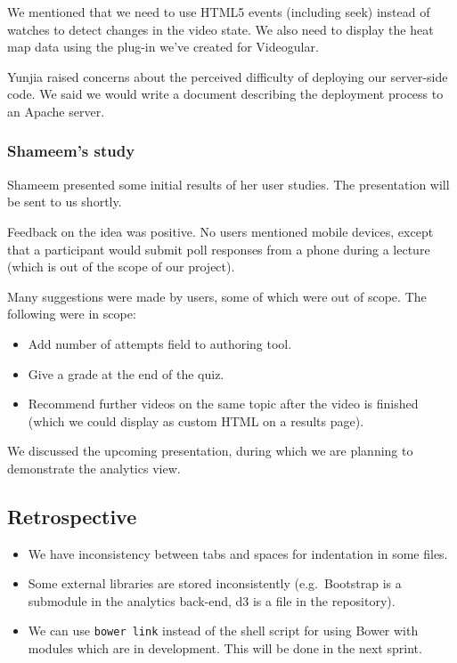 We mentioned that we need to use HTML5 events (including seek) instead
of watches to detect changes in the video state. We also need to display
the heat map data using the plug-in we've created for Videogular.

Yunjia raised concerns about the perceived difficulty of deploying our
server-side code. We said we would write a document describing the
deployment process to an Apache server.

\subsubsection{Shameem's study}

Shameem presented some initial results of her user studies. The
presentation will be sent to us shortly.

Feedback on the idea was positive. No users mentioned mobile devices,
except that a participant would submit poll responses from a phone
during a lecture (which is out of the scope of our project).

Many suggestions were made by users, some of which were out of scope.
The following were in scope:

\begin{itemize}
\itemsep1pt\parskip0pt
\item
  Add number of attempts field to authoring tool.
\item
  Give a grade at the end of the quiz.
\item
  Recommend further videos on the same topic after the video is finished
  (which we could display as custom HTML on a results page).
\end{itemize}

We discussed the upcoming presentation, during which we are planning to
demonstrate the analytics view.

\subsection{Retrospective}

\begin{itemize}
\itemsep1pt\parskip0pt
\item
  We have inconsistency between tabs and spaces for indentation in some
  files.
\item
  Some external libraries are stored inconsistently (e.g.~Bootstrap is a
  submodule in the analytics back-end, d3 is a file in the repository).
\item
  We can use \texttt{bower link} instead of the shell script for using
  Bower with modules which are in development. This will be done in the
  next sprint.
\end{itemize}

